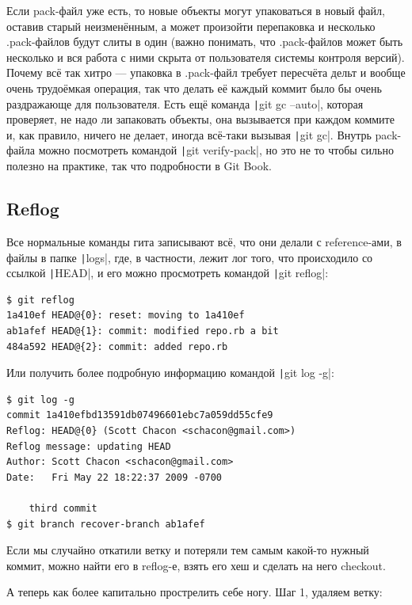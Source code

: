 \documentclass[a5paper]{article}
\begin{document}
Если pack-файл уже есть, то новые объекты могут упаковаться в новый файл, оставив старый неизменённым, а может произойти перепаковка и несколько .pack-файлов будут слиты в один (важно понимать, что .pack-файлов может быть несколько и вся работа с ними скрыта от пользователя системы контроля версий). Почему всё так хитро --- упаковка в .pack-файл требует пересчёта дельт и вообще очень трудоёмкая операция, так что делать её каждый коммит было бы очень раздражающе для пользователя. Есть ещё команда \texttt|git gc --auto|, которая проверяет, не надо ли запаковать объекты, она вызывается при каждом коммите и, как правило, ничего не делает, иногда всё-таки вызывая \texttt|git gc|. Внутрь pack-файла можно посмотреть командой \texttt|git verify-pack|, но это не то чтобы сильно полезно на практике, так что подробности в Git Book.

\subsection{Reflog}

Все нормальные команды гита записывают всё, что они делали с reference-ами, в файлы в папке \texttt|logs|, где, в частности, лежит лог того, что происходило со ссылкой \texttt|HEAD|, и его можно просмотреть командой \texttt|git reflog|:

\begin{verbatim}
$ git reflog
1a410ef HEAD@{0}: reset: moving to 1a410ef
ab1afef HEAD@{1}: commit: modified repo.rb a bit
484a592 HEAD@{2}: commit: added repo.rb
\end{verbatim}

Или получить более подробную информацию командой \texttt|git log -g|:

\begin{verbatim}
$ git log -g
commit 1a410efbd13591db07496601ebc7a059dd55cfe9
Reflog: HEAD@{0} (Scott Chacon <schacon@gmail.com>)
Reflog message: updating HEAD
Author: Scott Chacon <schacon@gmail.com>
Date:   Fri May 22 18:22:37 2009 -0700

    third commit
$ git branch recover-branch ab1afef
\end{verbatim}

Если мы случайно откатили ветку и потеряли тем самым какой-то нужный коммит, можно найти его в reflog-е, взять его хеш и сделать на него checkout.

А теперь как более капитально прострелить себе ногу. Шаг 1, удаляем ветку:
\end{document}
